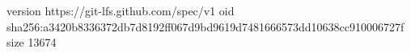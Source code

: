 version https://git-lfs.github.com/spec/v1
oid sha256:a3420b8336372db7d8192ff067d9bd9619d7481666573dd10638cc910006727f
size 13674
